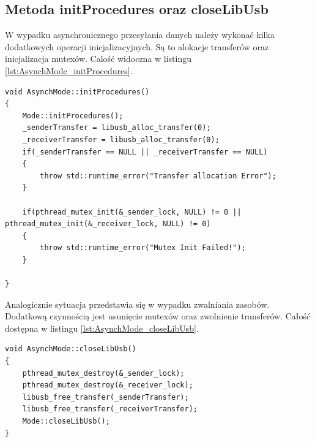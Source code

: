 \documentclass{BscUS}
\begin{document}
\subsection{Metoda initProcedures oraz closeLibUsb}
W wypadku asynchronicznego przesyłania danych należy wykonać kilka dodatkowych operacji inicjalizacyjnych. Są to alokacje transferów oraz inicjalizacja mutexów.
Calość widoczna w listingu \ref{lst:AsynchMode_initProcedures}.
\begin{lstlisting}[caption={Metoda AsynchMode::initProcedures},label={lst:AsynchMode_initProcedures}]
void AsynchMode::initProcedures()
{
	Mode::initProcedures();
	_senderTransfer = libusb_alloc_transfer(0);	
	_receiverTransfer = libusb_alloc_transfer(0);
	if(_senderTransfer == NULL || _receiverTransfer == NULL)
	{
		throw std::runtime_error("Transfer allocation Error");
	}

	if(pthread_mutex_init(&_sender_lock, NULL) != 0 || pthread_mutex_init(&_receiver_lock, NULL) != 0)
	{
		throw std::runtime_error("Mutex Init Failed!");
	}

}
\end{lstlisting}
Analogicznie sytuacja przedstawia się w wypadku zwalniania zasobów. Dodatkową czynnością jest usunięcie mutexów oraz zwolnienie transferów. Całość dostępna w listingu \ref{lst:AsynchMode_closeLibUsb}.
\begin{lstlisting}[caption={Metoda AsynchMode::closeLibUsb},label={lst:AsynchMode_closeLibUsb}]
void AsynchMode::closeLibUsb()
{
	pthread_mutex_destroy(&_sender_lock);
	pthread_mutex_destroy(&_receiver_lock);
	libusb_free_transfer(_senderTransfer);
	libusb_free_transfer(_receiverTransfer);
	Mode::closeLibUsb();
}
\end{lstlisting}
\end{document}
